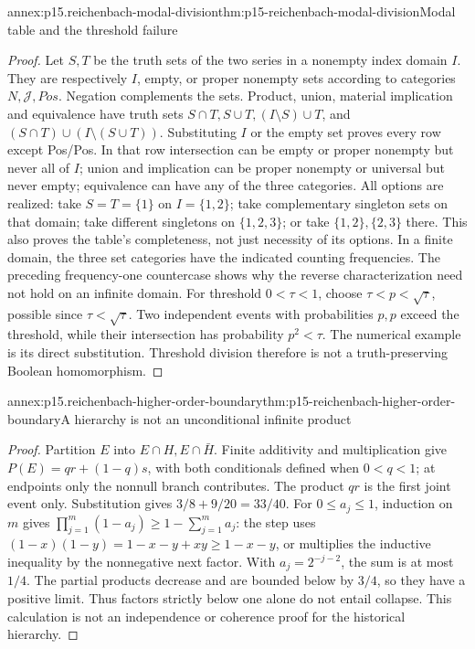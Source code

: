 \begin{annexitem}{annex:p15.reichenbach-modal-division}{thm:p15-reichenbach-modal-division}{Modal table and the threshold failure}
\begin{proof}
Let \(S,T\) be the truth sets of the two series in a nonempty
index domain \(I\). They are respectively \(I\), empty, or
proper nonempty sets according to categories \(N,\mathcal J,Pos\).
Negation complements the sets. Product, union, material implication
and equivalence have truth sets
\(S\cap T,S\cup T,(I\setminus S)\cup T\), and
\((S\cap T)\cup(I\setminus(S\cup T))\).
Substituting \(I\) or the empty set proves every row except
Pos/Pos. In that row intersection can be empty or proper nonempty
but never all of \(I\); union and implication can be proper
nonempty or universal but never empty; equivalence can have any of
the three categories. All options are realized: take \(S=T=\{1\}\)
on \(I=\{1,2\}\); take complementary singleton sets on that
domain; take different singletons on \(\{1,2,3\}\); or take
\(\{1,2\},\{2,3\}\) there. This also proves the table's
completeness, not just necessity of its options. In a finite domain,
the three set categories have the indicated counting frequencies.
The preceding frequency-one countercase shows why the reverse
characterization need not hold on an infinite domain.
For threshold \(0<\tau<1\), choose
\(\tau<p<\sqrt\tau\), possible since \(\tau<\sqrt\tau\).
Two independent events with probabilities \(p,p\) exceed the
threshold, while their intersection has probability \(p^2<\tau\).
The numerical example is its direct substitution. Threshold division
therefore is not a truth-preserving Boolean homomorphism.
\end{proof}
\end{annexitem}

\begin{annexitem}{annex:p15.reichenbach-higher-order-boundary}{thm:p15-reichenbach-higher-order-boundary}{A hierarchy is not an unconditional infinite product}
\begin{proof}
Partition \(E\) into \(E\cap H,E\cap\bar H\).
Finite additivity and multiplication give
\(P(E)=qr+(1-q)s\), with both conditionals defined when
\(0<q<1\); at endpoints only the nonnull branch contributes.
The product \(qr\) is the first joint event only. Substitution
gives \(3/8+9/20=33/40\).
For \(0\leq a_j\leq1\), induction on \(m\) gives
\(\prod_{j=1}^m(1-a_j)\geq1-\sum_{j=1}^m a_j\): the step
uses \((1-x)(1-y)=1-x-y+xy\geq1-x-y\), or multiplies
the inductive inequality by the nonnegative next factor. With
\(a_j=2^{-j-2}\), the sum is at most \(1/4\).
The partial products decrease and are bounded below by \(3/4\),
so they have a positive limit. Thus factors strictly below one alone
do not entail collapse. This calculation is not an independence or
coherence proof for the historical hierarchy.
\end{proof}
\end{annexitem}

